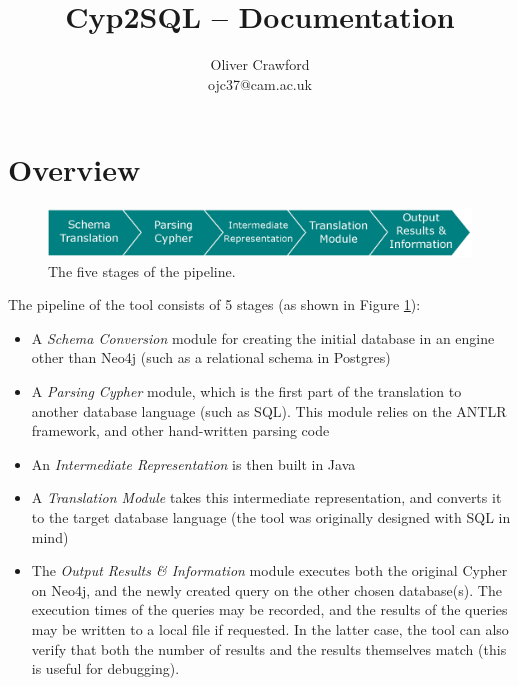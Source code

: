 \documentclass[letterpaper]{ltxdoc}
\begin{document}
\title{\textsf{Cyp2SQL -- Documentation}}

\author{Oliver Crawford\\ojc37@cam.ac.uk}

\maketitle


\tableofcontents
{}

\section{Overview}

\begin{figure}[h]
\centerline{\includegraphics[width=\textwidth,height=\textheight,keepaspectratio]{toolchainVec.eps}}
\caption{The five stages of the pipeline.}
\label{toolchain}
\end{figure}

The pipeline of the tool consists of 5 stages (as shown in Figure \ref{toolchain}):

\begin{itemize}
\item A \emph{Schema Conversion} module for creating the initial database in an engine other than Neo4j (such as a relational schema in Postgres)
\item A \emph{Parsing Cypher} module, which is the first part of the translation to another database language (such as SQL). This module relies on the ANTLR framework, and other hand-written parsing code
\item An \emph{Intermediate Representation} is then built in Java
\item A \emph{Translation Module} takes this intermediate representation, and converts it to the target database language (the tool was originally designed with SQL in mind)
\item The \emph{Output Results \& Information} module executes both the original Cypher on Neo4j, and the newly created query on the other chosen database(s). The execution times of the queries may be recorded, and the results of the queries may be written to a local file if requested. In the latter case, the tool can also verify that both the number of results and the results themselves match (this is useful for debugging).
\end{itemize}
\end{document}
